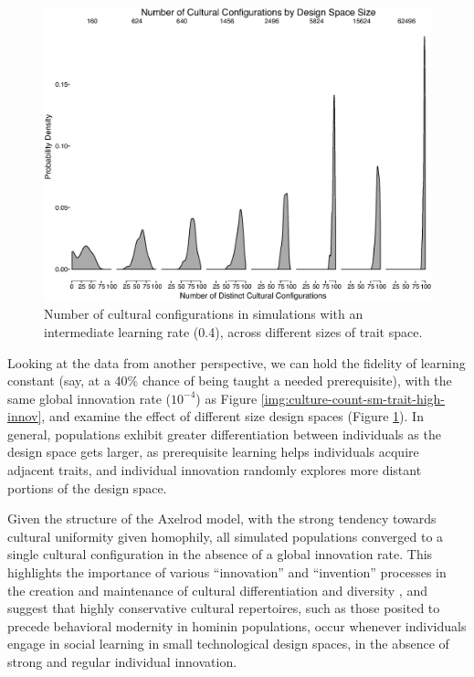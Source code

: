 \begin{figure}[htbp] 
    \centering
    \includegraphics[scale=0.4]{graphics/semanticaxelrod/culture-count-lr04-by-traitspace-size.eps}
    \caption{Number of cultural configurations in simulations with an intermediate learning rate (0.4), across different sizes of trait space.}
    \label{img:culture-count-lr04-by-traitspace-size}
\end{figure}

Looking at the data from another perspective, we can hold the fidelity
of learning constant (say, at a 40\% chance of being taught a needed
prerequisite), with the same global innovation rate ($10^{-4}$) as
Figure \ref{img:culture-count-sm-trait-high-innov}, and examine the
effect of different size design spaces (Figure
\ref{img:culture-count-lr04-by-traitspace-size}). In general,
populations exhibit greater differentiation between individuals as the
design space gets larger, as prerequisite learning helps individuals
acquire adjacent traits, and individual innovation randomly explores
more distant portions of the design space.

Given the structure of the Axelrod model, with the strong tendency
towards cultural uniformity given homophily, all simulated populations
converged to a single cultural configuration in the absence of a global
innovation rate. This highlights the importance of various
``innovation'' and ``invention'' processes in the creation and
maintenance of cultural differentiation and diversity
\citep{eerkens2005cultural, o2010innovation}, and suggest that highly
conservative cultural repertoires, such as those posited to precede
behavioral modernity in hominin populations, occur whenever individuals
engage in social learning in small technological design spaces, in the
absence of strong and regular individual innovation.

